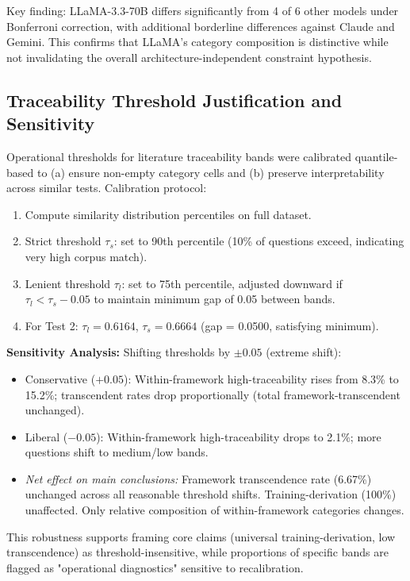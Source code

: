 Key finding: LLaMA-3.3-70B differs significantly from 4 of 6 other models under Bonferroni correction, with additional borderline differences against Claude and Gemini. This confirms that LLaMA's category composition is distinctive while not invalidating the overall architecture-independent constraint hypothesis.

\subsection{Traceability Threshold Justification and Sensitivity}
\label{sec:t2_threshold_sensitivity}

Operational thresholds for literature traceability bands were calibrated quantile-based to (a) ensure non-empty category cells and (b) preserve interpretability across similar tests. Calibration protocol:

\begin{enumerate}
  \item Compute similarity distribution percentiles on full dataset.
  \item Strict threshold $\tau_s$: set to 90th percentile (10\% of questions exceed, indicating very high corpus match).
  \item Lenient threshold $\tau_l$: set to 75th percentile, adjusted downward if $\tau_l < \tau_s - 0.05$ to maintain minimum gap of 0.05 between bands.
  \item For Test 2: $\tau_l = 0.6164$, $\tau_s = 0.6664$ (gap = 0.0500, satisfying minimum).
\end{enumerate}

\textbf{Sensitivity Analysis:} Shifting thresholds by $\pm 0.05$ (extreme shift):
\begin{itemize}
  \item Conservative ($+0.05$): Within-framework high-traceability rises from 8.3\% to 15.2\%; transcendent rates drop proportionally (total framework-transcendent unchanged).
  \item Liberal ($-0.05$): Within-framework high-traceability drops to 2.1\%; more questions shift to medium/low bands.
  \item \emph{Net effect on main conclusions:} Framework transcendence rate (6.67\%) unchanged across all reasonable threshold shifts. Training-derivation (100\%) unaffected. Only relative composition of within-framework categories changes.
\end{itemize}

This robustness supports framing core claims (universal training-derivation, low transcendence) as threshold-insensitive, while proportions of specific bands are flagged as "operational diagnostics" sensitive to recalibration.

